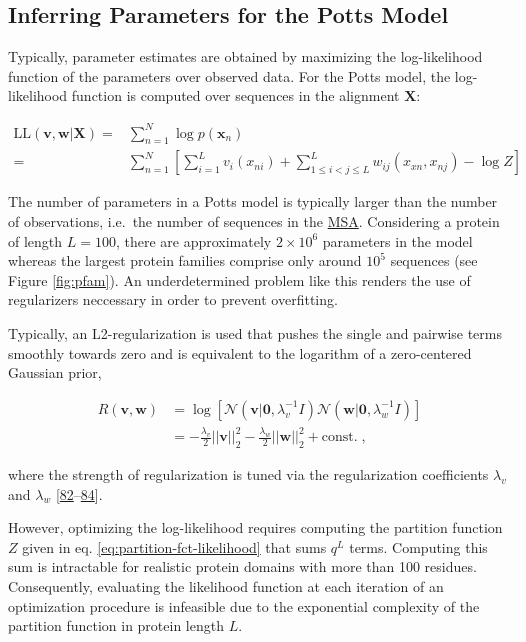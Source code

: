 \documentclass[12pt,a4paper,twoside]{book}
\newcommand{\seq}{\mathbf{x}}
\renewcommand{\v}{\mathbf{v}}
\newcommand{\w}{\mathbf{w}}
\theoremstyle{definition}
\theoremstyle{definition}
\theoremstyle{remark}
\begin{document}
\subsection{Inferring Parameters for the Potts Model}\label{potts-mle}

Typically, parameter estimates are obtained by maximizing the
log-likelihood function of the parameters over observed data. For the
Potts model, the log-likelihood function is computed over sequences in
the alignment \(\mathbf{X}\):

\begin{align}
    \text{LL}(\v, \w | \mathbf{X}) =& \sum_{n=1}^N \log p(\seq_n)  \nonumber\\
    =& \sum_{n=1}^N \left[ \sum_{i=1}^L v_i(x_{ni}) + \sum_{1 \leq i < j \leq L}^L w_{ij}(x_{xn}, x_{nj}) - \log Z \right]
\label{eq:full-log-likelihood}
\end{align}

The number of parameters in a Potts model is typically larger than the
number of observations, i.e.~the number of sequences in the
\protect\hyperlink{abbrev}{MSA}. Considering a protein of length
\(L=100\), there are approximately \(2 \times 10^6\) parameters in the
model whereas the largest protein families comprise only around \(10^5\)
sequences (see Figure \ref{fig:pfam}). An underdetermined problem like
this renders the use of regularizers neccessary in order to prevent
overfitting.

Typically, an L2-regularization is used that pushes the single and
pairwise terms smoothly towards zero and is equivalent to the logarithm
of a zero-centered Gaussian prior,

\begin{align}
  R(\v, \w)  &= \log \left[ \mathcal{N}(\v | \mathbf{0}, \lambda_v^{-1} I) \mathcal{N}(\w | \mathbf{0}, \lambda_w^{-1} I) \right] \nonumber \\
             &= -\frac{\lambda_v}{2} ||\v||_2^2 - \frac{\lambda_w}{2} ||\w||_2^2 + \text{const.} \; ,
\label{eq:l2-reg}
\end{align}

where the strength of regularization is tuned via the regularization
coefficients \(\lambda_v\) and \(\lambda_w\)
{[}\protect\hyperlink{ref-Seemayer2014}{82}--\protect\hyperlink{ref-Kamisetty2013}{84}{]}.

However, optimizing the log-likelihood requires computing the partition
function \(Z\) given in eq. \eqref{eq:partition-fct-likelihood} that sums
\(q^L\) terms. Computing this sum is intractable for realistic protein
domains with more than 100 residues. Consequently, evaluating the
likelihood function at each iteration of an optimization procedure is
infeasible due to the exponential complexity of the partition function
in protein length \(L\).
\end{document}

